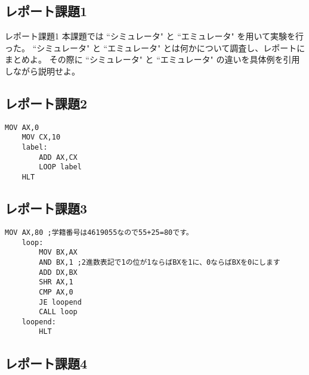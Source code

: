\documentclass[12pt]{jarticle}
\begin{document}
\subsection{レポート課題1}
\begin{itembox}[l]{レポート課題1}
	本課題では ``シミュレータ" と ``エミュレータ" を用いて実験を行った。
	``シミュレータ" と ``エミュレータ" とは何かについて調査し、レポートにまとめよ。
	その際に ``シミュレータ" と ``エミュレータ" の違いを具体例を引用しながら説明せよ。
\end{itembox}

\subsection{レポート課題2}

\begin{lstlisting}[caption=sum\_4619055.asm,label=sum]
	MOV AX,0
	MOV CX,10
	label:
		ADD AX,CX
		LOOP label
	HLT
\end{lstlisting}


\subsection{レポート課題3}

\begin{lstlisting}[caption=nbits\_4619055.asm,label=nbits]
	MOV AX,80 ;学籍番号は4619055なので55+25=80です。
	loop:
		MOV BX,AX
		AND BX,1 ;2進数表記で1の位が1ならばBXを1に、0ならばBXを0にします
		ADD DX,BX
		SHR AX,1
		CMP AX,0
		JE loopend
		CALL loop
	loopend: 
		HLT
\end{lstlisting}


\subsection{レポート課題4}
\end{document}
